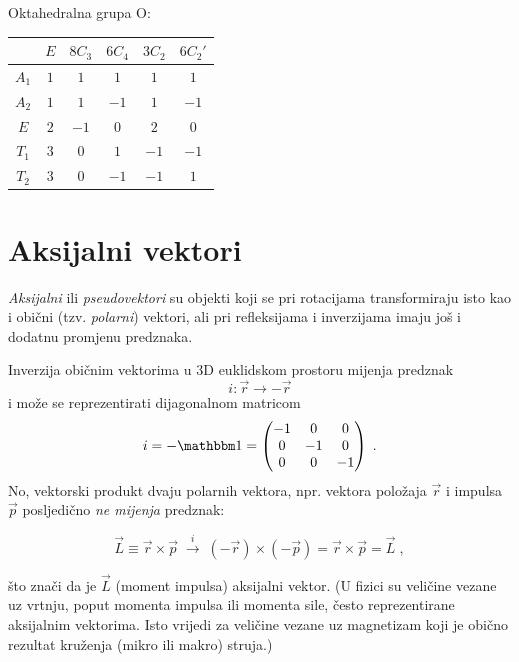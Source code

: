Oktahedralna grupa O: 

\begin{center}
\renewcommand{\arraystretch}{1.2}
\begin{tabular}{c|ccccc}
     & $E$ & $8C_3$ & $6C_4$ & $3C_2$ & $6C_2'$ \\ \hline
    $A_1$ & $1$ & $1$ & $1$ & $1$ & $1$ \\
    $A_2$ & $1$ & $1$ & $-1$ & $1$ & $-1$ \\
    $E$   & $2$ & $-1$ & $0$ & $2$ & $0$ \\
    $T_1$ & $3$ & $0$ & $1$ & $-1$ & $-1$ \\
    $T_2$ & $3$ & $0$ & $-1$ & $-1$ & $1$ \\
\end{tabular}
\end{center}





\chapter{Aksijalni vektori}
\label{sec:aksijalni}
 
\emph{Aksijalni} ili \emph{pseudovektori} su objekti koji se pri rotacijama transformiraju
isto kao i obični (tzv. \emph{polarni}) vektori, ali pri refleksijama i inverzijama
imaju još i dodatnu promjenu predznaka.

Inverzija običnim vektorima u 3D euklidskom prostoru mijenja
predznak 
$$i: \vec{r} \to - \vec{r}$$ 
i može se reprezentirati dijagonalnom
matricom 
$$
i = -\Eins = 
\begin{pmatrix}
    -1 & 0 & 0 \\
    0 & -1 & 0 \\
    0 & 0 & -1
\end{pmatrix} \;.
$$
No, vektorski produkt dvaju polarnih vektora, npr. vektora položaja $\vec{r}$
i impulsa $\vec{p}$ posljedično \emph{ne mijenja} predznak:

\[  \vec{L}\equiv \vec{r}\times\vec{p} \; \stackrel{i}{\longrightarrow} \;
  (-\vec{r}) \times (-\vec{p}) =  \vec{r}\times\vec{p} = \vec{L}  \;,
\]

što znači da je $\vec{L}$ (moment impulsa) aksijalni vektor. (U fizici su
veličine vezane uz vrtnju, poput momenta impulsa ili momenta sile, 
često reprezentirane aksijalnim vektorima. Isto vrijedi za veličine
vezane uz magnetizam koji je obično rezultat kruženja (mikro ili makro) struja.)

